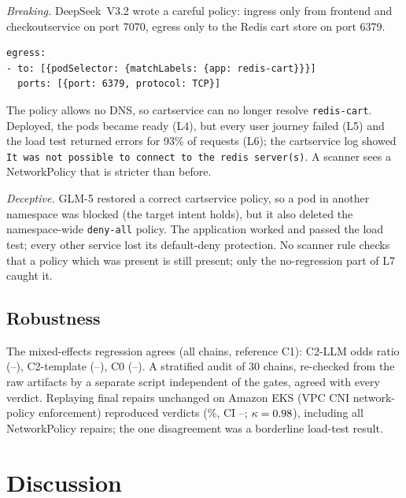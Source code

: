 \documentclass[10pt]{article}
\begin{document}
\emph{Breaking.} DeepSeek~V3.2 wrote a careful policy: ingress only from frontend and checkoutservice on port 7070, egress
only to the Redis cart store on port 6379.
\begin{lstlisting}
egress:
- to: [{podSelector: {matchLabels: {app: redis-cart}}}]
  ports: [{port: 6379, protocol: TCP}]
\end{lstlisting}
The policy allows no DNS, so cartservice can no longer resolve \texttt{redis-cart}. Deployed, the pods became ready
(L4), but every user journey failed (L5) and the load test returned errors for 93\% of requests (L6); the cartservice log
showed \texttt{It was not possible to connect to the redis server(s)}. A scanner sees a NetworkPolicy that is stricter
than before.

\emph{Deceptive.} GLM-5 restored a correct cartservice policy, so a pod in another namespace was blocked (the target
intent holds), but it also deleted the namespace-wide \texttt{deny-all} policy. The application worked and passed the
load test; every other service lost its default-deny protection. No scanner rule checks that a policy which was
present is still present; only the no-regression part of L7 caught it.

\subsection{Robustness}\label{sec:robust}
The mixed-effects regression agrees (all chains, reference C1): C2-LLM odds ratio \RegAllChainsConditionCtwoLLMOr{}
(\RegAllChainsConditionCtwoLLMOrLo--\RegAllChainsConditionCtwoLLMOrHi), C2-template
\RegAllChainsConditionCtwoTemplateOr{} (\RegAllChainsConditionCtwoTemplateOrLo--\RegAllChainsConditionCtwoTemplateOrHi),
C0 \RegAllChainsConditionCzeroOr{} (\RegAllChainsConditionCzeroOrLo--\RegAllChainsConditionCzeroOrHi).
A stratified audit of 30 chains, re-checked from the raw artifacts by a separate script independent of the gates,
agreed with every verdict.
Replaying \PeightAgreeN{} final repairs unchanged on Amazon EKS (VPC CNI network-policy enforcement) reproduced
\PeightAgreeK{} verdicts (\PeightAgreePct\%, CI \PeightAgreeLo--\PeightAgreeHi; $\kappa=0.98$), including all
\PeightNetworkPolicyK{} NetworkPolicy repairs; the one disagreement was a borderline load-test result.

\section{Discussion}
\end{document}
